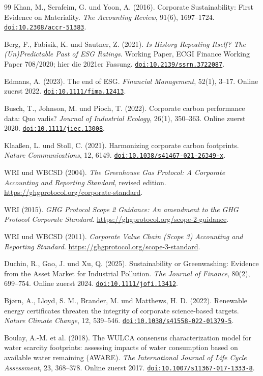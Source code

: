 \documentclass[11pt,a4paper]{article}
\newcommand{\doi}[1]{\href{https://doi.org/#1}{\nolinkurl{doi:#1}}}
\begin{document}
\begin{thebibliography}{99}
 Khan, M., Serafeim, G. und Yoon, A. (2016). Corporate Sustainability: First Evidence on Materiality. \emph{The Accounting Review}, 91(6), 1697--1724. \doi{10.2308/accr-51383}.

 Berg, F., Fabisik, K. und Sautner, Z. (2021). \emph{Is History Repeating Itself? The (Un)Predictable Past of ESG Ratings}. Working Paper, ECGI Finance Working Paper 708/2020; hier die 2021er Fassung. \doi{10.2139/ssrn.3722087}.

 Edmans, A. (2023). The end of ESG. \emph{Financial Management}, 52(1), 3--17. Online zuerst 2022. \doi{10.1111/fima.12413}.

 Busch, T., Johnson, M. und Pioch, T. (2022). Corporate carbon performance data: Quo vadis? \emph{Journal of Industrial Ecology}, 26(1), 350--363. Online zuerst 2020. \doi{10.1111/jiec.13008}.

 Klaaßen, L. und Stoll, C. (2021). Harmonizing corporate carbon footprints. \emph{Nature Communications}, 12, 6149. \doi{10.1038/s41467-021-26349-x}.

 WRI und WBCSD (2004). \emph{The Greenhouse Gas Protocol: A Corporate Accounting and Reporting Standard}, revised edition. \url{https://ghgprotocol.org/corporate-standard}.

 WRI (2015). \emph{GHG Protocol Scope 2 Guidance: An amendment to the GHG Protocol Corporate Standard}. \url{https://ghgprotocol.org/scope-2-guidance}.

 WRI und WBCSD (2011). \emph{Corporate Value Chain (Scope 3) Accounting and Reporting Standard}. \url{https://ghgprotocol.org/scope-3-standard}.

 Duchin, R., Gao, J. und Xu, Q. (2025). Sustainability or Greenwashing: Evidence from the Asset Market for Industrial Pollution. \emph{The Journal of Finance}, 80(2), 699--754. Online zuerst 2024. \doi{10.1111/jofi.13412}.

 Bjørn, A., Lloyd, S. M., Brander, M. und Matthews, H. D. (2022). Renewable energy certificates threaten the integrity of corporate science-based targets. \emph{Nature Climate Change}, 12, 539--546. \doi{10.1038/s41558-022-01379-5}.

 Boulay, A.-M. et al. (2018). The WULCA consensus characterization model for water scarcity footprints: assessing impacts of water consumption based on available water remaining (AWARE). \emph{The International Journal of Life Cycle Assessment}, 23, 368--378. Online zuerst 2017. \doi{10.1007/s11367-017-1333-8}.


\end{thebibliography}
\end{document}
